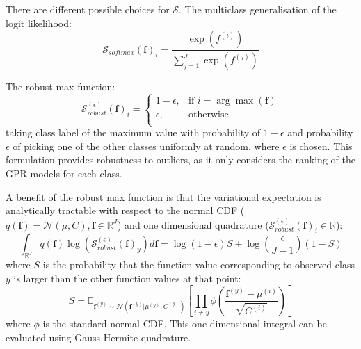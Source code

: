 \documentclass[twoside,11pt]{article}
\begin{document}
There are different possible choices for $\mathcal{S}$.
The multiclass generalisation of the logit likelihood:
\[\mathcal{S}_{softmax}(\mathbf{f})_i = \frac{\exp(f^{(i)})}{\sum_{j=1}^{J} \exp(f^{(j)})}\]

The robust max function:
\[\mathcal{S}_{robust}^{(\epsilon)}(\mathbf{f})_i = \begin{cases}
      1-\epsilon, &  \text{if } i = \arg \max(\mathbf{f}) \\
      \epsilon, & \text{otherwise} \\
   \end{cases}\]
taking class label of the maximum value with probability of $1-\epsilon$ and probability $\epsilon$ of picking one of the other classes uniformly at random, where $\epsilon$ is chosen.
This formulation provides robustness to outliers, as it only considers the ranking of the GPR models for each class.

A benefit of the robust max function is that the variational expectation is analytically tractable with respect to the normal CDF ($q(\mathbf{f}) = \mathcal{N}(\mu, C), \mathbf{f} \in \mathbb{R}^J$) and one dimensional quadrature ($\mathcal{S}_{robust}^{(\epsilon)}(\mathbf{f})_i \in \mathbb{R}$):
\[\int_{\mathbb{R}^J} q(\mathbf{f}) \log(\mathcal{S}_{robust}^{(\epsilon)}(\mathbf{f})_y) d\textbf{f} = \log(1-\epsilon) S + \log\left(\frac{\epsilon}{J-1}\right)(1-S)\]
where $S$ is the probability that the function value corresponding to observed class $y$ is larger than the other function values at that point:
\[S = \mathbb{E}_{\mathbf{f}^{(y)} \sim \mathcal{N}(\mathbf{f}^{(y)} | \mu^{(y)}, C^{(y)})} \left[\prod_{i \neq y} \phi \left(\frac{\textbf{f}^{(y)}-\mu^{(i)}}{\sqrt{C^{(i)}}} \right)\right]\]
where $\phi$ is the standard normal CDF. This one dimensional integral can be evaluated using Gauss-Hermite quadrature.





\newpage



\end{document}
